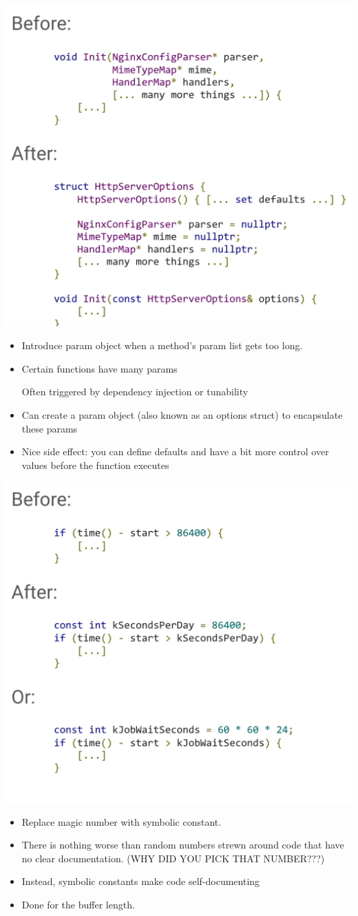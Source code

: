 \documentclass{article}
\begin{document}
\includegraphics*[width=0.6\linewidth]{refactorEx2.png}

\begin{center}
    \begin{itemize}
        \item Introduce param object when a method's param list gets too long.
        \item Certain functions have many params\par
        Often triggered by dependency injection or tunability
        \item Can create a param object (also known as an options struct) to encapsulate these params
        \item Nice side effect: you can define defaults and have a bit more control over values before the function executes
    \end{itemize}
\end{center}

\includegraphics*[width=0.6\linewidth]{refactorEx3.png}

\begin{center}
    \begin{itemize}
        \item Replace magic number with symbolic constant.
        \item There is nothing worse than random numbers strewn around code that have no clear documentation. (WHY DID YOU PICK THAT NUMBER???)
        \item Instead, symbolic constants make code self-documenting
        \item Done for the buffer length.
    \end{itemize}
\end{center}
\end{document}
